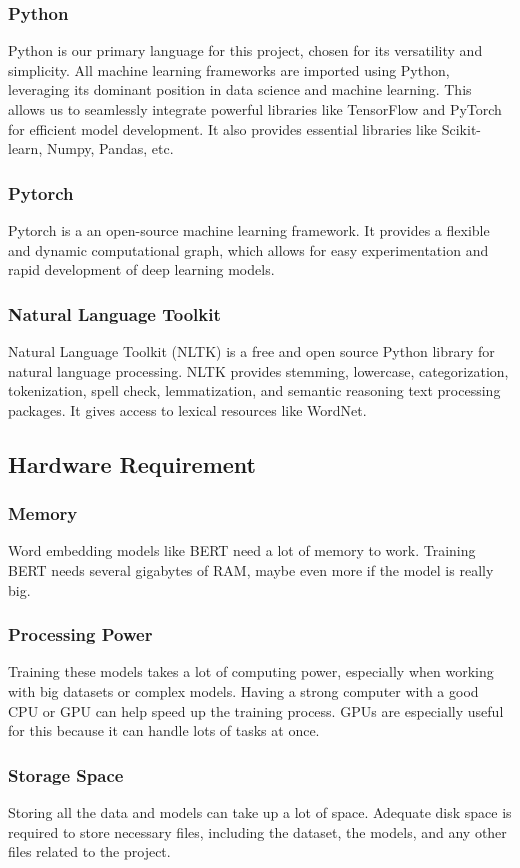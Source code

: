     \subsubsection*{Python} 
    Python is our primary language for this project, chosen for its versatility and simplicity. All machine learning frameworks are imported using Python, leveraging its dominant position in data science and machine learning. This allows us to seamlessly integrate powerful libraries like TensorFlow and PyTorch for efficient model development. It also provides essential libraries like Scikit-learn, Numpy, Pandas, etc.

    \subsubsection*{Pytorch}
    Pytorch is a an open-source machine learning framework. It provides a flexible and dynamic computational graph, which allows for easy experimentation and rapid development of deep learning models. 

    \subsubsection*{Natural Language Toolkit}
    Natural Language Toolkit (NLTK) is a free and open source Python library for natural language processing. NLTK provides stemming, lowercase, categorization, tokenization, spell check, lemmatization, and semantic reasoning text processing packages. It gives access to lexical resources like WordNet.


    \subsection{Hardware Requirement}
    \subsubsection*{Memory}
    Word embedding models like BERT need a lot of memory to work. Training BERT needs several gigabytes of RAM, maybe even more if the model is really big. 

    \subsubsection*{Processing Power}
    Training these models takes a lot of computing power, especially when working with big datasets or complex models. Having a strong computer with a good CPU or GPU can help speed up the training process. GPUs are especially useful for this because it can handle lots of tasks at once.

    \subsubsection*{Storage Space}
    Storing all the data and models can take up a lot of space. Adequate disk space is required to store necessary files, including the dataset, the models, and any other files related to the project.


